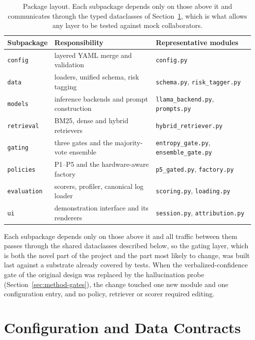 \begin{table}[t]
  \centering
  \small
  \begin{tabular}{@{}lll@{}}
    \toprule
    Subpackage & Responsibility & Representative modules \\
    \midrule
    \texttt{config} & layered YAML merge and validation & \texttt{config.py} \\
    \texttt{data} & loaders, unified schema, risk tagging & \texttt{schema.py}, \texttt{risk\_tagger.py} \\
    \texttt{models} & inference backends and prompt construction & \texttt{llama\_backend.py}, \texttt{prompts.py} \\
    \texttt{retrieval} & BM25, dense and hybrid retrievers & \texttt{hybrid\_retriever.py} \\
    \texttt{gating} & three gates and the majority-vote ensemble & \texttt{entropy\_gate.py}, \texttt{ensemble\_gate.py} \\
    \texttt{policies} & P1--P5 and the hardware-aware factory & \texttt{p5\_gated.py}, \texttt{factory.py} \\
    \texttt{evaluation} & scorers, profiler, canonical log loader & \texttt{scoring.py}, \texttt{loading.py} \\
    \texttt{ui} & demonstration interface and its renderers & \texttt{session.py}, \texttt{attribution.py} \\
    \bottomrule
  \end{tabular}
  \caption{Package layout. Each subpackage depends only on those above it and
  communicates through the typed dataclasses of Section~\ref{sec:impl-config},
  which is what allows any layer to be tested against mock collaborators.}
  \label{tab:impl-modules}
\end{table}

Each subpackage depends only on those above it and all traffic between them
passes through the shared dataclasses described below, so the gating layer,
which is both the novel part of the project and the part most likely to
change, was built last against a substrate already covered by tests. When the
verbalized-confidence gate of the original design was replaced by the
hallucination probe (Section~\ref{sec:method-gates}), the change touched one
new module and one configuration entry, and no policy, retriever or scorer
required editing.

\section{Configuration and Data Contracts}
\label{sec:impl-config}

